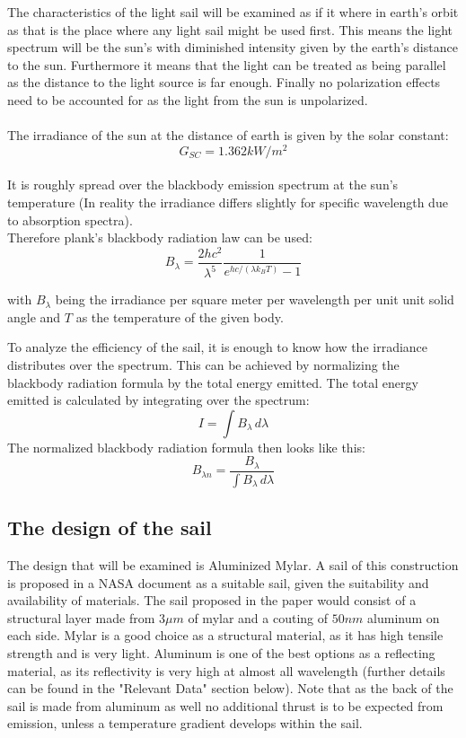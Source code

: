 \documentclass[14pt]{article}
\begin{document}
The characteristics of the light sail will be examined as if it where in earth's orbit as that is the place where any light sail might be used first.
This means the light spectrum will be the sun's with diminished intensity given by the earth's distance to the sun. Furthermore it means that the light
can be treated as being parallel as the distance to the light source is far enough. Finally no polarization effects need to be accounted for as the 
light from the sun is unpolarized.\\
\\
The irradiance of the sun at the distance of earth is given by the solar constant:
$$
G_{SC} = 1.362 kW/m^2
$$
\\

It is roughly spread over the blackbody emission spectrum at the sun's 
temperature (In reality the irradiance differs slightly for specific wavelength due to absorption spectra).\\

Therefore plank's blackbody radiation law can be used:
$$ 
B_{\lambda} = \frac{2 h c^2}{\lambda^5} \frac{1}{e^{h c / (\lambda k_B T)}-1}
$$

with $B_{\lambda}$ being the irradiance per square meter per wavelength per unit unit solid angle and $T$ as the temperature of the given body.

To analyze the efficiency of the sail, it is enough to know how the irradiance distributes over the spectrum. This can be achieved
by normalizing the blackbody radiation formula by the total energy emitted.
The total energy emitted is calculated by integrating over the spectrum:
$$
I = \int B_{\lambda} \,d \lambda
$$
The normalized blackbody radiation formula then looks like this:
$$
B_{\lambda n} = \frac{B_{\lambda}}{\int B_{\lambda} \,d \lambda}
$$


\subsection{The design of the sail}

The design that will be examined is Aluminized Mylar. A sail of this construction is proposed in a NASA document as a suitable
sail, given the suitability and availability of materials\autocite{hollerman}. The sail proposed in the paper would consist
of a structural layer made from $ 3 \mu m$ of mylar and a couting of $ 50 nm$ aluminum on each side. Mylar is a good choice
as a structural material, as it has high tensile strength and is very light. Aluminum is one of the best options as a
reflecting material, as its reflectivity is very high at almost all wavelength (further details can be found in the "Relevant Data"
section below). Note that as the back of the sail is made from aluminum as well no additional thrust is to be expected from emission, 
unless a temperature gradient develops within the sail.
\end{document}

